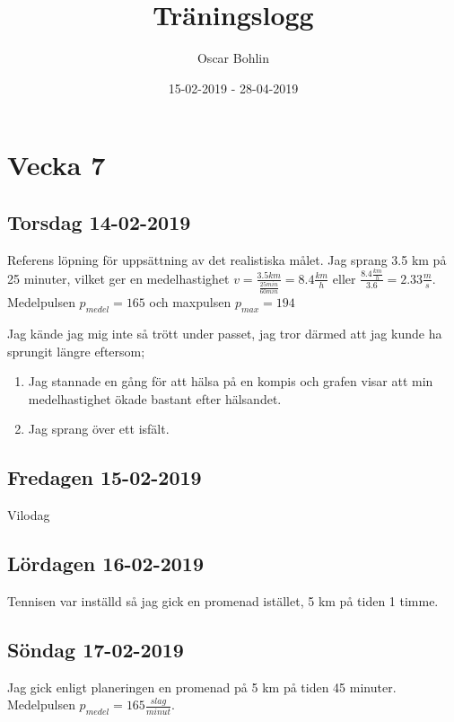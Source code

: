 \documentclass[a4paper, 12pt]{article}
\title{Träningslogg}
\date{15-02-2019 - 28-04-2019}
\author{Oscar Bohlin}
\begin{document}
\maketitle
\newpage
{}
\tableofcontents
\newpage


\section{Vecka 7}

\subsection{Torsdag 14-02-2019}

    Referens löpning för uppsättning av det realistiska målet. Jag sprang 3.5 km på 25 minuter, vilket ger en medelhastighet $v = \frac{3.5km}{\frac{25min}{60min}} = 8.4\frac{km}{h}$ eller $\frac{8.4\frac{km}{h}}{3.6} = 2.33\frac{m}{s}$. Medelpulsen $p_{medel} = 165$ och maxpulsen $p_{max} = 194$

    Jag kände jag mig inte så trött under passet, jag tror därmed att jag kunde ha sprungit längre eftersom;

\begin{enumerate}
     \item Jag stannade en gång för att hälsa på en kompis och grafen visar att min medelhastighet ökade bastant efter hälsandet.
    \item Jag sprang över ett isfält. 

\end{enumerate}

\subsection{Fredagen 15-02-2019}

    Vilodag 

\subsection{Lördagen 16-02-2019}
    Tennisen var inställd så jag gick en promenad istället, 5 km på tiden 1 timme. 

\subsection{Söndag 17-02-2019}
    Jag gick enligt planeringen en promenad på 5 km på tiden 45 minuter. Medelpulsen $p_{medel} = 165\frac{slag}{minut}$.
\end{document}
